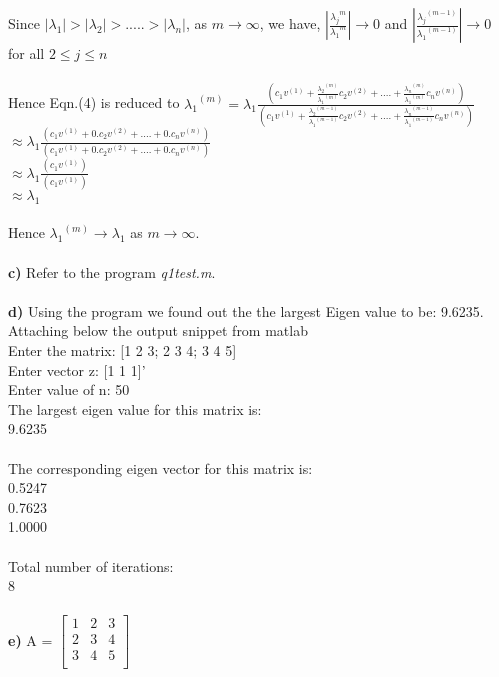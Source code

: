 \documentclass{article}
\begin{document}
Since $\left|{{\lambda}_1} \right| > \left|{{\lambda}_2} \right| > ..... > \left|{{\lambda}_n} \right|$, as $m \rightarrow \infty$, we have, $\left|\frac{{{\lambda}_j}^m}{{{\lambda}_1}^m}\right| \rightarrow 0$ and  $\left|\frac{{{\lambda}_j}^{(m-1)}}{{{\lambda}_1}^{(m-1)}}\right| \rightarrow 0$ for all $2 \leq j \leq n$\\
\\
Hence Eqn.(4) is reduced to ${{{\lambda}_1}^{(m)}} = {{\lambda}_1}\frac{({c_1}{v^{(1)}} + \frac{{{\lambda}_2}^{(m)}}{{{\lambda}_1}^{(m)}}{c_2}{v^{(2)}} + ....  +  \frac{{{\lambda}_n}^{(m)}}{{{\lambda}_1}^{(m)}}{c_n}{v^{(n)}})}{({c_1}{v^{(1)}} + \frac{{{\lambda}_2}^{(m-1)}}{{{\lambda}_1}^{(m-1)}}{c_2}{v^{(2)}} + ....  +  \frac{{{\lambda}_n}^{(m-1)}}{{{\lambda}_1}^{(m-1)}}{c_n}{v^{(n)}})}$\\
$ \approx {{\lambda}_1}\frac{({c_1}{v^{(1)}} + 0.{c_2}{v^{(2)}} + ....  +  0.{c_n}{v^{(n)}})}{({c_1}{v^{(1)}} + 0.{c_2}{v^{(2)}} + ....  +  0.{c_n}{v^{(n)}})}$\\
$ \approx {{\lambda}_1}\frac{({c_1}{v^{(1)}})}{({c_1}{v^{(1)}})}$\\
$ \approx {{\lambda}_1}$\\
\\
Hence ${{{\lambda}_1}^{(m)}} \rightarrow {{\lambda}_1}$ as $m \rightarrow \infty$.\\
\\
{\bf c)} Refer to the program {\it q1test.m}.\\
\\
{\bf d)} Using the program we found out the the largest Eigen value to be: 9.6235. Attaching below the output snippet from matlab\\
Enter the matrix: [1 2 3; 2 3 4; 3 4 5]\\
Enter vector z: [1 1 1]'\\
Enter value of n: 50\\
The largest eigen value for this matrix is:\\ 
    9.6235\\
\\
The corresponding eigen vector for this matrix is:\\ 
    0.5247\\
    0.7623\\
    1.0000\\
\\
Total number of iterations:\\ 
     8\\
\\
{\bf e)}
A = $\begin{bmatrix}
1   &     2&       3\\
   2  &  3    &    4\\
    3  &  4 &   5 \\
\end{bmatrix}$ \\
\end{document}
